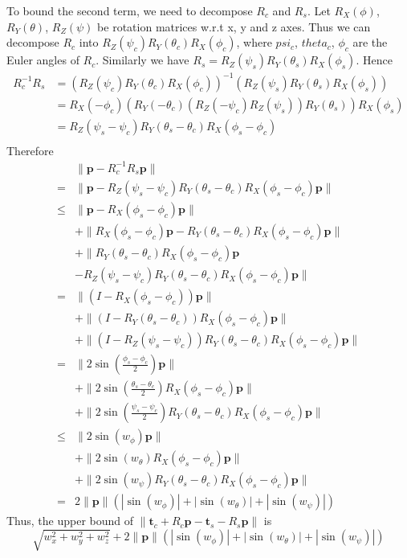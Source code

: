 \documentclass[review]{acmsiggraph}
\newcommand{\bt}{\mathbf{t}}
\newcommand{\bp}{\mathbf{p}}
\begin{document}
To bound the second term, we need to decompose $R_c$ and $R_s$.
Let $R_X(\phi)$, $R_Y(\theta)$, $R_Z(\psi)$ be rotation matrices w.r.t x, y and z axes.
Thus we can decompose $R_c$ into $R_Z(\psi_c)R_Y(\theta_c)R_X(\phi_c)$, where $psi_c$, $theta_c$, $\phi_c$ are the Euler angles of $R_c$.
Similarly we have $R_s=R_Z(\psi_s)R_Y(\theta_s)R_X(\phi_s)$.
Hence 
\begin{align*}
	R_c^{-1}R_s &= (R_Z(\psi_c)R_Y(\theta_c)R_X(\phi_c))^{-1}(R_Z(\psi_s)R_Y(\theta_s)R_X(\phi_s)) \\
	&= R_X(-\phi_c)(R_Y(-\theta_c)(R_Z(-\psi_c)R_Z(\psi_s))R_Y(\theta_s))R_X(\phi_s) \\
	&= R_Z(\psi_s-\psi_c)R_Y(\theta_s-\theta_c)R_X(\phi_s-\phi_c) \\
\end{align*}
Therefore
\begin{align*}
	 & \| \bp - R_c^{-1}R_s \bp\| \\
	=& \| \bp - R_Z(\psi_s-\psi_c)R_Y(\theta_s-\theta_c)R_X(\phi_s-\phi_c)\bp\| \\
	\le& \| \bp - R_X(\phi_s-\phi_c)\bp \| \\
	 &+ \| R_X(\phi_s-\phi_c)\bp - R_Y(\theta_s-\theta_c)R_X(\phi_s-\phi_c)\bp \| \\
	 &+ \|R_Y(\theta_s-\theta_c)R_X(\phi_s-\phi_c)\bp \\
	 &  - R_Z(\psi_s-\psi_c)R_Y(\theta_s-\theta_c)R_X(\phi_s-\phi_c)\bp\| \\
	=& \| (I - R_X(\phi_s-\phi_c))\bp \| \\
	 &+ \| (I - R_Y(\theta_s-\theta_c))R_X(\phi_s-\phi_c)\bp \| \\
	 &+ \| (I - R_Z(\psi_s-\psi_c))R_Y(\theta_s-\theta_c)R_X(\phi_s-\phi_c)\bp\| \\
	=& \| 2\sin(\frac{\phi_s-\phi_c}{2})\bp \| \\
	 &+ \| 2\sin(\frac{\theta_s-\theta_c}{2})R_X(\phi_s-\phi_c)\bp \| \\
	 &+ \| 2\sin(\frac{\psi_s-\psi_c}{2})R_Y(\theta_s-\theta_c)R_X(\phi_s-\phi_c)\bp\| \\
	\le& \| 2\sin(w_\phi)\bp \| \\
	 &+ \| 2\sin(w_\theta)R_X(\phi_s-\phi_c)\bp \| \\
	 &+ \| 2\sin(w_\psi)R_Y(\theta_s-\theta_c)R_X(\phi_s-\phi_c)\bp\| \\
	=& 2\|\bp\|(|\sin(w_\phi)|+|\sin(w_\theta)|+|\sin(w_\psi)|)
\end{align*}
Thus, the upper bound of $\|\bt_c + R_c\bp - \bt_s - R_s\bp\|$ is
\[
\sqrt{w_x^2 + w_y^2+w_z^2} + 2\|\bp\|(|\sin(w_\phi)|+|\sin(w_\theta)|+|\sin(w_\psi)|)
\]
\end{document}
